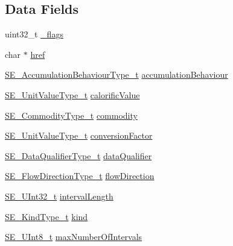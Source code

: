 \subsection*{Data Fields}
\begin{DoxyCompactItemize}
\item 
uint32\+\_\+t \hyperlink{group__ReadingType_ga0b47ada65894fa1e36bc0d185d21a71d}{\+\_\+flags}
\item 
char $\ast$ \hyperlink{group__ReadingType_gaab72122e2abf41553e43032788338e3e}{href}
\item 
\hyperlink{group__AccumulationBehaviourType_gaa25de69f43be64dff9ec0bdf3ef685d2}{S\+E\+\_\+\+Accumulation\+Behaviour\+Type\+\_\+t} \hyperlink{group__ReadingType_ga4ed3a5e9fe3ab6c2ea585504d1d6a239}{accumulation\+Behaviour}
\item 
\hyperlink{structSE__UnitValueType__t}{S\+E\+\_\+\+Unit\+Value\+Type\+\_\+t} \hyperlink{group__ReadingType_ga57e12f39f9ed0fcdb2a9b83dab5b3e2f}{calorific\+Value}
\item 
\hyperlink{group__CommodityType_ga8c7268080f04fe151221243d3c68eb8c}{S\+E\+\_\+\+Commodity\+Type\+\_\+t} \hyperlink{group__ReadingType_gac70ce0c79f4a38a96aa90aa1843907c1}{commodity}
\item 
\hyperlink{structSE__UnitValueType__t}{S\+E\+\_\+\+Unit\+Value\+Type\+\_\+t} \hyperlink{group__ReadingType_ga479e0031bba268429db70bbcb9f4ef2d}{conversion\+Factor}
\item 
\hyperlink{group__DataQualifierType_gad1c718c173804210c9562a1ef63a9bf6}{S\+E\+\_\+\+Data\+Qualifier\+Type\+\_\+t} \hyperlink{group__ReadingType_gac7db2fdae63614e7fd7e738071012fa7}{data\+Qualifier}
\item 
\hyperlink{group__FlowDirectionType_ga83b9e4bedc8eaad2a4210b0dab7be48e}{S\+E\+\_\+\+Flow\+Direction\+Type\+\_\+t} \hyperlink{group__ReadingType_ga13cc7653b3ac0633618440d2ad240aa0}{flow\+Direction}
\item 
\hyperlink{group__UInt32_ga70bd4ecda3c0c85d20779d685a270cdb}{S\+E\+\_\+\+U\+Int32\+\_\+t} \hyperlink{group__ReadingType_ga27fb2c72d4c94d8e2b9ddd66ac40b089}{interval\+Length}
\item 
\hyperlink{group__KindType_gaaa33b4be52e2f2c6decfbdcb8d4edc21}{S\+E\+\_\+\+Kind\+Type\+\_\+t} \hyperlink{group__ReadingType_ga9b4451c6dfbfd971677fe48371e3190c}{kind}
\item 
\hyperlink{group__UInt8_gaf7c365a1acfe204e3a67c16ed44572f5}{S\+E\+\_\+\+U\+Int8\+\_\+t} \hyperlink{group__ReadingType_ga2d016202de3cc2404cf2065adeaeb4f7}{max\+Number\+Of\+Intervals}
\item 

\end{DoxyCompactItemize}
